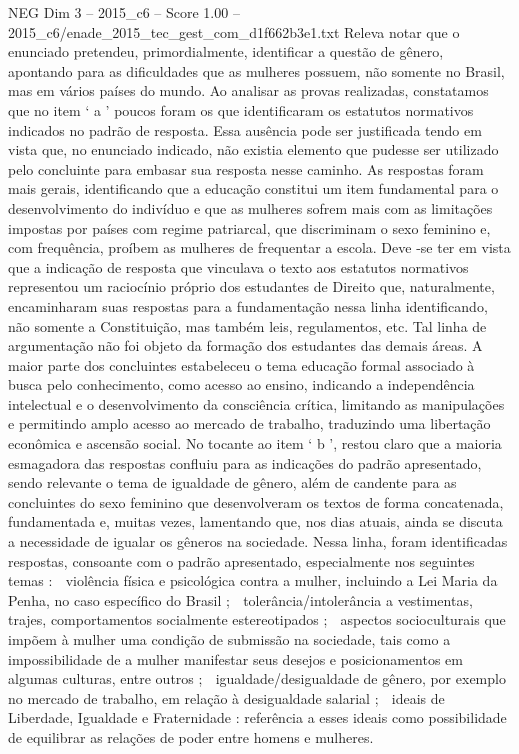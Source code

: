 \begin{textsample}{NEG Dim 3 – 2015\_c6 – Score 1.00 – 2015\_c6/enade\_2015\_tec\_gest\_com\_d1f662b3e1.txt}
Releva notar que o enunciado pretendeu, primordialmente, identificar a questão de gênero, apontando para as dificuldades que as mulheres possuem, não somente no Brasil, mas em vários países do mundo.
Ao analisar as provas realizadas, constatamos que no item ‘ a ’ poucos foram os que identificaram os estatutos normativos indicados no padrão de resposta.
Essa ausência pode ser justificada tendo em vista que, no enunciado indicado, não existia elemento que pudesse ser utilizado pelo concluinte para embasar sua resposta nesse caminho.
As respostas foram mais gerais, identificando que a educação constitui um item fundamental para o desenvolvimento do indivíduo e que as mulheres sofrem mais com as limitações impostas por países com regime patriarcal, que discriminam o sexo feminino e, com frequência, proíbem as mulheres de frequentar a escola.
Deve -se ter em vista que a indicação de resposta que vinculava o texto aos estatutos normativos representou um raciocínio próprio dos estudantes de Direito que, naturalmente, encaminharam suas respostas para a fundamentação nessa linha identificando, não somente a Constituição, mas também leis, regulamentos, etc.
Tal linha de argumentação não foi objeto da formação dos estudantes das demais áreas.
A maior parte dos concluintes estabeleceu o tema educação formal associado à busca pelo conhecimento, como acesso ao ensino, indicando a independência intelectual e o desenvolvimento da consciência crítica, limitando as manipulações e permitindo amplo acesso ao mercado de trabalho, traduzindo uma libertação econômica e ascensão social.
No tocante ao item ‘ b ’, restou claro que a maioria esmagadora das respostas confluiu para as indicações do padrão apresentado, sendo relevante o tema de igualdade de gênero, além de candente para as concluintes do sexo feminino que desenvolveram os textos de forma concatenada, fundamentada e, muitas vezes, lamentando que, nos dias atuais, ainda se discuta a necessidade de igualar os gêneros na sociedade.
Nessa linha, foram identificadas respostas, consoante com o padrão apresentado, especialmente nos seguintes temas :  violência física e psicológica contra a mulher, incluindo a Lei Maria da Penha, no caso específico do Brasil ;  tolerância/intolerância a vestimentas, trajes, comportamentos socialmente estereotipados ;  aspectos socioculturais que impõem à mulher uma condição de submissão na sociedade, tais como a impossibilidade de a mulher manifestar seus desejos e posicionamentos em algumas culturas, entre outros ;  igualdade/desigualdade de gênero, por exemplo no mercado de trabalho, em relação à desigualdade salarial ;  ideais de Liberdade, Igualdade e Fraternidade : referência a esses ideais como possibilidade de equilibrar as relações de poder entre homens e mulheres.

\end{textsample}
